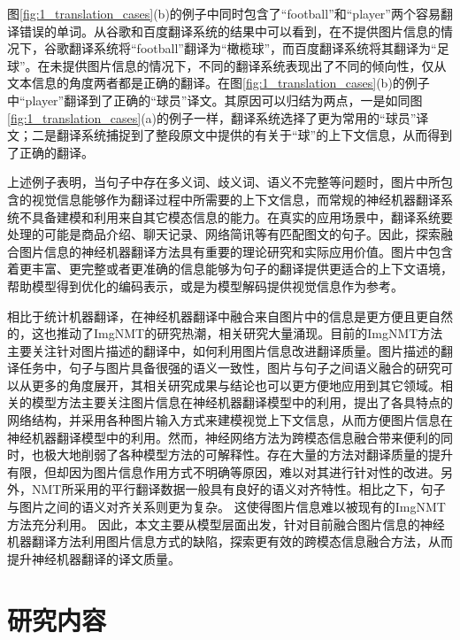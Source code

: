 图\ref{fig:1_translation_cases}(b)的例子中同时包含了“football”和“player”两个容易翻译错误的单词。从谷歌和百度翻译系统的结果中可以看到，在不提供图片信息的情况下，谷歌翻译系统将“football”翻译为“橄榄球”，而百度翻译系统将其翻译为“足球”。在未提供图片信息的情况下，不同的翻译系统表现出了不同的倾向性，仅从文本信息的角度两者都是正确的翻译。在图\ref{fig:1_translation_cases}(b)的例子中“player”翻译到了正确的“球员”译文。其原因可以归结为两点，一是如同图\ref{fig:1_translation_cases}(a)的例子一样，翻译系统选择了更为常用的“球员”译文；二是翻译系统捕捉到了整段原文中提供的有关于“球”的上下文信息，从而得到了正确的翻译。


上述例子表明，当句子中存在多义词、歧义词、语义不完整等问题时，图片中所包含的视觉信息能够作为翻译过程中所需要的上下文信息，而常规的神经机器翻译系统不具备建模和利用来自其它模态信息的能力。在真实的应用场景中，翻译系统要处理的可能是商品介绍、聊天记录、网络简讯等有匹配图文的句子。因此，探索融合图片信息的神经机器翻译方法具有重要的理论研究和实际应用价值。图片中包含着更丰富、更完整或者更准确的信息能够为句子的翻译提供更适合的上下文语境，帮助模型得到优化的编码表示，或是为模型解码提供视觉信息作为参考。

相比于统计机器翻译，在神经机器翻译中融合来自图片中的信息是更方便且更自然的，这也推动了ImgNMT的研究热潮，相关研究大量涌现。目前的ImgNMT方法主要关注针对图片描述的翻译中，如何利用图片信息改进翻译质量。图片描述的翻译任务中，句子与图片具备很强的语义一致性，图片与句子之间语义融合的研究可以从更多的角度展开，其相关研究成果与结论也可以更方便地应用到其它领域。相关的模型方法主要关注图片信息在神经机器翻译模型中的利用，提出了各具特点的网络结构，并采用各种图片输入方式来建模视觉上下文信息，从而方便图片信息在神经机器翻译模型中的利用。然而，神经网络方法为跨模态信息融合带来便利的同时，也极大地削弱了各种模型方法的可解释性。存在大量的方法对翻译质量的提升有限，但却因为图片信息作用方式不明确等原因，难以对其进行针对性的改进。另外，NMT所采用的平行翻译数据一般具有良好的语义对齐特性。相比之下，句子与图片之间的语义对齐关系则更为复杂。
这使得图片信息难以被现有的ImgNMT方法充分利用。%
因此，本文主要从模型层面出发，针对目前融合图片信息的神经机器翻译方法利用图片信息方式的缺陷，探索更有效的跨模态信息融合方法，从而提升神经机器翻译的译文质量。


\section{研究内容}

